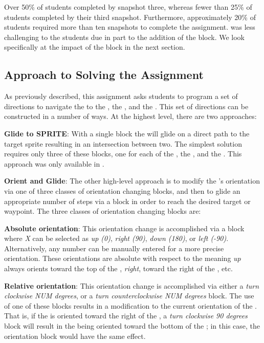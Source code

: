 Over 50\% of \stwo{} students completed by snapshot three, whereas fewer than
25\% of \sone{} students completed by their third snapshot. Furthermore,
approximately 20\% of \sone{} \com{} students required more than ten snapshots
to complete the assignment. \stwo{} was less challenging to the students due in
part to the addition of the \glideto{} block. We look specifically at the
impact of the \glideto{} block in the next section.

\subsection{Approach to Solving the Assignment}
As previously described, this assignment asks students to program a set of
directions to navigate the \net{} to \catch{} the \bear{}, the \horse{},
and the \zebra{}. This set of directions can be constructed in a number of
ways. At the highest level, there are two approaches:

\textbf{Glide to SPRITE}: With a single \glideto{} block the \net{} will glide
on a direct path to the target sprite resulting in an intersection between
two. The simplest \com{} solution requires only three of these blocks, one for
each of the \bear{}, the \horse{}, and the \zebra{}. This approach was only
available in \stwo{}.

\textbf{Orient and Glide}: The other high-level approach is to modify the
\net{}'s orientation via one of three classes of orientation changing blocks,
and then to glide an appropriate number of steps via a \glideDIST{} block in
order to reach the desired target or waypoint. The three classes of orientation
changing blocks are:

\textbf{Absolute orientation}: This orientation change is accomplished via a
\pointDIR{} block where \emph{X} can be selected as \emph{up (0)}, \emph{right
  (90)}, \emph{down (180)}, or \emph{left (-90)}. Alternatively, any number can
be manually entered for a more precise orientation. These orientations are
absolute with respect to the \stage{} meaning \emph{up} always orients toward
the top of the \stage{}, \emph{right}, toward the right of the \stage{}, etc.

\textbf{Relative orientation}: This orientation change is accomplished via
either a \emph{turn clockwise NUM degrees}, or a \emph{turn counterclockwise
  NUM degrees} block. The use of one of these blocks results in a modification
to the current orientation of the \net{}. That is, if the \net{} is oriented
toward the right of the \stage{}, a \emph{turn clockwise 90 degrees} block will
result in the \net{} being oriented toward the bottom of the \stage{}; in this
case, the \abs{} orientation block \pointDIR[down]{} would have the same
effect.

